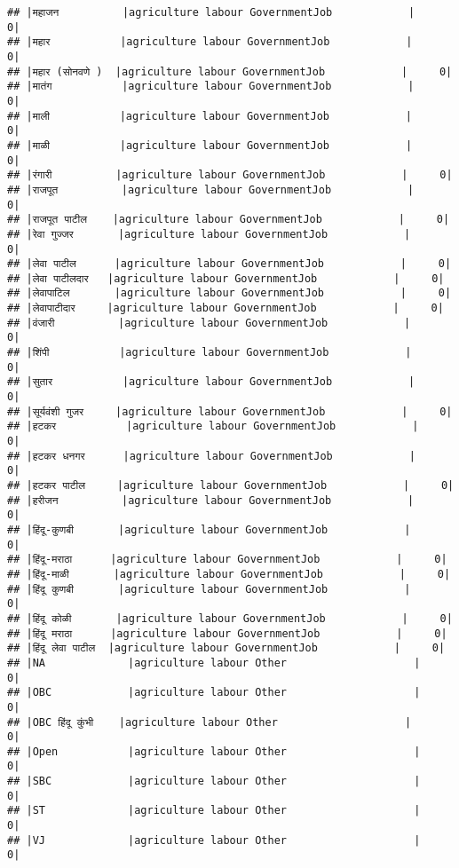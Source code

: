 \documentclass[
]{article}
\begin{document}
\begin{verbatim}
## |महाजन          |agriculture labour GovernmentJob            |     0|
## |महार           |agriculture labour GovernmentJob            |     0|
## |महार (सोनवणे )  |agriculture labour GovernmentJob            |     0|
## |मातंग           |agriculture labour GovernmentJob            |     0|
## |माली           |agriculture labour GovernmentJob            |     0|
## |माळी           |agriculture labour GovernmentJob            |     0|
## |रंगारी          |agriculture labour GovernmentJob            |     0|
## |राजपूत          |agriculture labour GovernmentJob            |     0|
## |राजपूत पाटील    |agriculture labour GovernmentJob            |     0|
## |रेवा गुज्जर       |agriculture labour GovernmentJob            |     0|
## |लेवा पाटील      |agriculture labour GovernmentJob            |     0|
## |लेवा पाटीलदार   |agriculture labour GovernmentJob            |     0|
## |लेवापाटिल       |agriculture labour GovernmentJob            |     0|
## |लेवापाटीदार     |agriculture labour GovernmentJob            |     0|
## |वंजारी          |agriculture labour GovernmentJob            |     0|
## |शिंपी           |agriculture labour GovernmentJob            |     0|
## |सुतार           |agriculture labour GovernmentJob            |     0|
## |सूर्यवंशी गुजर     |agriculture labour GovernmentJob            |     0|
## |हटकर           |agriculture labour GovernmentJob            |     0|
## |हटकर धनगर      |agriculture labour GovernmentJob            |     0|
## |हटकर पाटील     |agriculture labour GovernmentJob            |     0|
## |हरीजन          |agriculture labour GovernmentJob            |     0|
## |हिंदू-कुणबी       |agriculture labour GovernmentJob            |     0|
## |हिंदू-मराठा      |agriculture labour GovernmentJob            |     0|
## |हिंदू-माळी       |agriculture labour GovernmentJob            |     0|
## |हिंदू कुणबी       |agriculture labour GovernmentJob            |     0|
## |हिंदू कोळी       |agriculture labour GovernmentJob            |     0|
## |हिंदू मराठा      |agriculture labour GovernmentJob            |     0|
## |हिंदू लेवा पाटील  |agriculture labour GovernmentJob            |     0|
## |NA             |agriculture labour Other                    |     0|
## |OBC            |agriculture labour Other                    |     0|
## |OBC हिंदू कुंभी    |agriculture labour Other                    |     0|
## |Open           |agriculture labour Other                    |     0|
## |SBC            |agriculture labour Other                    |     0|
## |ST             |agriculture labour Other                    |     0|
## |VJ             |agriculture labour Other                    |     0|

\end{verbatim}
\end{document}
